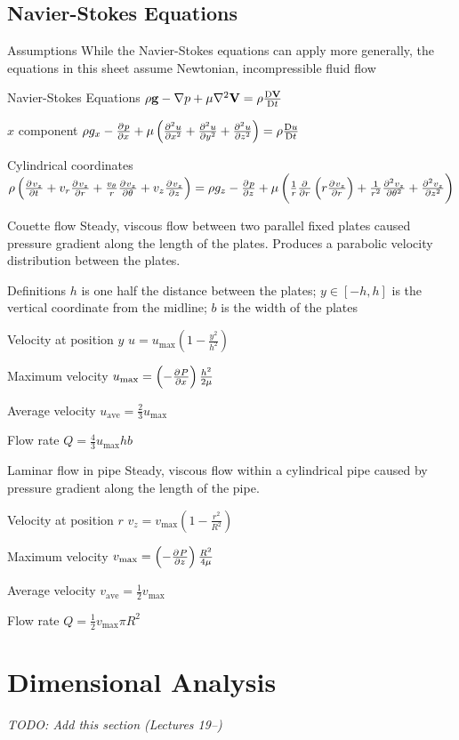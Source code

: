 \documentclass{article}
\begin{document}
\subsection{Navier-Stokes Equations}
\begin{description*}
\item[Assumptions] While the Navier-Stokes equations can apply more generally, the equations in this
  sheet assume Newtonian, incompressible fluid flow
\item[Navier-Stokes Equations]
  \(\rho\vec{g} - \vec\nabla p + \mu\vec\nabla^2\vec{V} = \rho\frac{\Dif\vec V}{\Dif t}\)
\item[$x$ component]
  \(\rho g_x - \pd{p}{x} + \mu\left(\pd[2]{u}{x}+\pd[2]{u}{y}+\pd[2]{u}{z}\right) = \rho\frac{\Dif u}{\Dif t}\)
\item[Cylindrical coordinates]
  \(\rho\left(\pd{v_z}{t}+v_r\pd{v_z}{r}+\frac{v_\theta}{r}\pd{v_z}{\theta}+v_z\pd{v_z}{z}\right)
  = \rho g_z - \pd{p}{z}
  + \mu\left(\frac{1}{r}\pd{}{r}\left(r\pd{v_z}{r}\right)
    + \frac{1}{r^2}\pd[2]{v_z}{\theta}
    + \pd[2]{v_z}{z}\right)\)
\item[Couette flow] Steady, viscous flow between two parallel fixed plates caused pressure gradient
  along the length of the plates. Produces a parabolic velocity distribution between the plates.
  \begin{description*}
  \item[Definitions] $h$ is one half the distance between the plates;
    $y\in[-h,h]$ is the vertical coordinate from the midline;
    $b$ is the width of the plates
  \item[Velocity at position $y$]
    \(u = u_\mathrm{max}\left(1-\frac{y^2}{h^2}\right)\)
  \item[Maximum velocity]
    \(u_\mathrm{max} = \left(-\pd{P}{x}\right)\frac{h^2}{2\mu}\)
  \item[Average velocity]
    \(u_\mathrm{ave} = \frac{2}{3}u_\mathrm{max}\)
  \item[Flow rate]
    \(Q = \frac{4}{3}u_\mathrm{max}hb\)
  \end{description*}
\item[Laminar flow in pipe] Steady, viscous flow within a cylindrical pipe caused by pressure
  gradient along the length of the pipe.
  \begin{description*}
  \item[Velocity at position $r$]
    \(v_z = v_\mathrm{max}\left(1 - \frac{r^2}{R^2}\right)\)
  \item[Maximum velocity]
    \(v_\mathrm{max} = \left(-\pd{P}{z}\right)\frac{R^2}{4\mu}\)
  \item[Average velocity]
    \(v_\mathrm{ave} = \frac{1}{2}v_\mathrm{max}\)
  \item[Flow rate]
    \(Q = \frac{1}{2}v_\mathrm{max}\pi R^2\)
  \end{description*}
\end{description*}

\section{Dimensional Analysis}
\emph{TODO: Add this section (Lectures 19--)}
\end{document}
